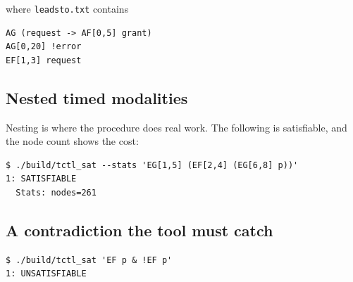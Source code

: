 \noindent
where \texttt{leadsto.txt} contains

\begin{lstlisting}[style=formula]
AG (request -> AF[0,5] grant)
AG[0,20] !error
EF[1,3] request
\end{lstlisting}

\subsection{Nested timed modalities}

Nesting is where the procedure does real work.  The following is satisfiable,
and the node count shows the cost:

\begin{lstlisting}
$ ./build/tctl_sat --stats 'EG[1,5] (EF[2,4] (EG[6,8] p))'
1: SATISFIABLE
  Stats: nodes=261
\end{lstlisting}

\subsection{A contradiction the tool must catch}

\begin{lstlisting}
$ ./build/tctl_sat 'EF p & !EF p'
1: UNSATISFIABLE
\end{lstlisting}

